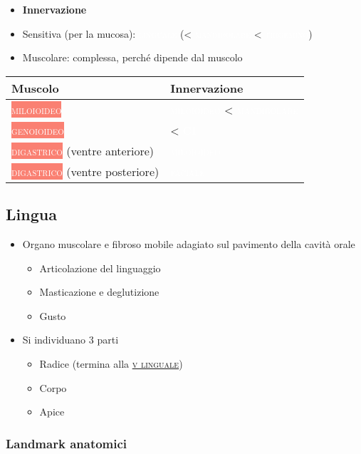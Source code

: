 \documentclass[italian,]{article}
\providecommand{\tightlist}{%
  \setlength{\itemsep}{0pt}\setlength{\parskip}{0pt}}
\newcommand{\mus}[1]{\colorbox{Salmon}{\textcolor{white}{\textsc{#1}}}}
\newcommand{\ner}[1]{\colorbox{Dandelion}{\textcolor{white}{\textsc{#1}}}}
\renewcommand{\a}[1]{\underline{\textsc{#1}}}
\begin{document}
\begin{itemize}
\tightlist
\item
  \textbf{Innervazione}
\item
  Sensitiva (per la mucosa): \ner{linguale} (\textless{}
  \ner{mandibolare} \textless{} \ner{trigemino})
\item
  Muscolare: complessa, perché dipende dal muscolo
\end{itemize}

\begin{longtable}[]{@{}ll@{}}
\toprule
Muscolo & Innervazione\tabularnewline
\midrule
\endhead
\mus{miloioideo} & \ner{miloioideo} \textless{}
\ner{mandibolare}\tabularnewline
\mus{genoioideo} & \textless{} \ner{C1}\tabularnewline
\mus{digastrico} (ventre anteriore) & \ner{miloioideo}\tabularnewline
\mus{digastrico} (ventre posteriore) & \ner{faciale}\tabularnewline
\bottomrule
\end{longtable}

\hypertarget{lingua}{%
\subsection{\texorpdfstring{Lingua
\label{lbllingua}}{Lingua }}\label{lingua}}

\begin{itemize}
\tightlist
\item
  Organo muscolare e fibroso mobile adagiato sul pavimento della cavità
  orale

  \begin{itemize}
  \tightlist
  \item
    Articolazione del linguaggio
  \item
    Masticazione e deglutizione
  \item
    Gusto
  \end{itemize}
\item
  Si individuano 3 parti

  \begin{itemize}
  \tightlist
  \item
    Radice (termina alla \a{v linguale})
  \item
    Corpo
  \item
    Apice
  \end{itemize}
\end{itemize}

\hypertarget{landmark-anatomici}{%
\subsubsection{Landmark anatomici}\label{landmark-anatomici}}
\end{document}
